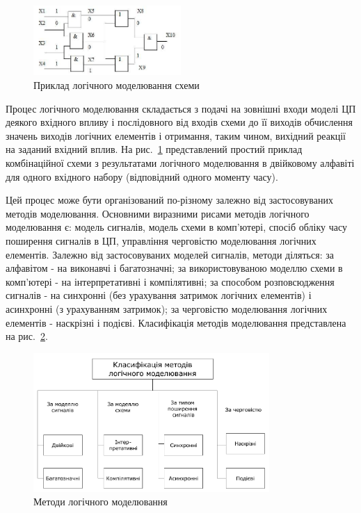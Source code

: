 \documentclass[12pt,a4paper]{article}
\begin{document}
\begin{figure}[h]
  \centering
    \includegraphics[width=0.5\textwidth]{03_02.jpg}
  \caption{Приклад логічного моделювання схеми\label{logicModEx}}
\end{figure}

Процес логічного моделювання складається з подачі на зовнішні входи моделі ЦП деякого вхідного впливу і послідовного від входів схеми до її виходів обчислення значень виходів логічних елементів і отримання, таким чином, вихідний реакції на заданий вхідний вплив. На рис.~\ref{logicModEx} представлений простий приклад комбінаційної схеми з результатами логічного моделювання в двійковому алфавіті для одного вхідного набору (відповідний одного моменту часу).

Цей процес може бути організований по-різному залежно від застосовуваних методів моделювання. Основними виразними рисами методів логічного моделювання є: модель сигналів, модель схеми в комп'ютері, спосіб обліку часу поширення сигналів в ЦП, управління черговістю моделювання логічних елементів. Залежно від застосовуваних моделей сигналів, методи діляться: за алфавітом - на виконавчі і багатозначні; за використовуваною моделлю схеми в комп'ютері - на інтерпретативні і компілятивні; за способом розповсюдження сигналів - на синхронні (без урахування затримок логічних елементів) і асинхронні (з урахуванням затримок); за черговістю моделювання логічних елементів - наскрізні і подієві. Класифікація методів моделювання представлена ​​на рис.~\ref{logicModMethods}.

\begin{figure}[h]
  \centering
    \includegraphics[width=0.8\textwidth]{logic-modelling-methods-classification}
  \caption{Методи логічного моделювання\label{logicModMethods}}
\end{figure}
\end{document}
